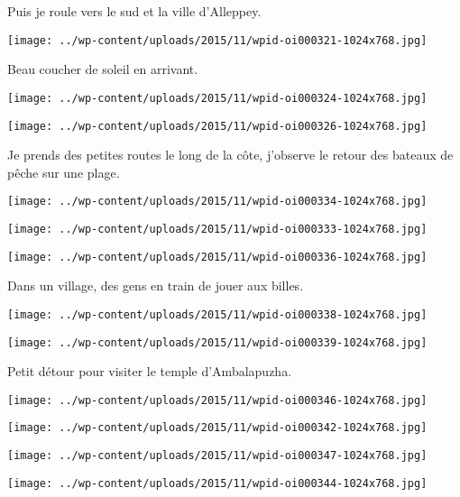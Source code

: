  Puis je roule vers le sud et la ville d'Alleppey. 
\begin{center} \texttt{[image: ../wp-content/uploads/2015/11/wpid-oi000321-1024x768.jpg]} \end{center}

\pagebreak
 Beau coucher de soleil en arrivant. 
\begin{center} \texttt{[image: ../wp-content/uploads/2015/11/wpid-oi000324-1024x768.jpg]} \end{center}
\begin{center} \texttt{[image: ../wp-content/uploads/2015/11/wpid-oi000326-1024x768.jpg]} \end{center}

\pagebreak
  Je prends des petites routes le long de la côte, j'observe le retour des bateaux de pêche sur une plage. 
\begin{center} \texttt{[image: ../wp-content/uploads/2015/11/wpid-oi000334-1024x768.jpg]} \end{center}
\begin{center} \texttt{[image: ../wp-content/uploads/2015/11/wpid-oi000333-1024x768.jpg]} \end{center}
\begin{center} \texttt{[image: ../wp-content/uploads/2015/11/wpid-oi000336-1024x768.jpg]} \end{center}

 Dans un village, des gens en train de jouer aux billes. 
\begin{center} \texttt{[image: ../wp-content/uploads/2015/11/wpid-oi000338-1024x768.jpg]} \end{center}
\begin{center} \texttt{[image: ../wp-content/uploads/2015/11/wpid-oi000339-1024x768.jpg]} \end{center}

 Petit détour pour visiter le temple d'Ambalapuzha. 
\begin{center} \texttt{[image: ../wp-content/uploads/2015/11/wpid-oi000346-1024x768.jpg]} \end{center}
\begin{center} \texttt{[image: ../wp-content/uploads/2015/11/wpid-oi000342-1024x768.jpg]} \end{center}
\begin{center} \texttt{[image: ../wp-content/uploads/2015/11/wpid-oi000347-1024x768.jpg]} \end{center}
\begin{center} \texttt{[image: ../wp-content/uploads/2015/11/wpid-oi000344-1024x768.jpg]} \end{center}

